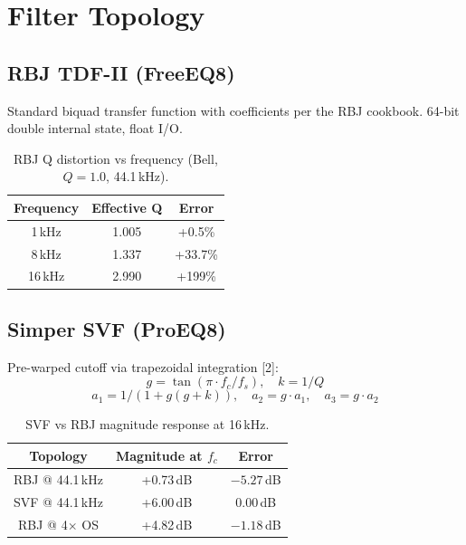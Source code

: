 \documentclass[twoside,a4paper]{article}
\begin{document}
\section{Filter Topology}
\subsection{RBJ TDF-II (FreeEQ8)}
Standard biquad transfer function with coefficients per the RBJ cookbook. 64-bit double internal state, float I/O.

\begin{table}[ht]
  \caption{RBJ Q distortion vs frequency (Bell, $Q=1.0$, 44.1\,kHz).}
  \centering
  \begin{tabular}{ccc}\toprule
    Frequency & Effective Q & Error \\\midrule
    1\,kHz & 1.005 & +0.5\% \\
    8\,kHz & 1.337 & +33.7\% \\
    16\,kHz & 2.990 & +199\% \\\bottomrule
  \end{tabular}
  \label{tab:qdistortion}
\end{table}

\subsection{Simper SVF (ProEQ8)}
Pre-warped cutoff via trapezoidal integration [2]:
\begin{equation}
g = \tan(\pi \cdot f_c / f_s), \quad k = 1/Q
\end{equation}
\begin{equation}
a_1 = 1 / (1 + g(g + k)), \quad a_2 = g \cdot a_1, \quad a_3 = g \cdot a_2
\end{equation}

\begin{table}[ht]
  \caption{SVF vs RBJ magnitude response at 16\,kHz.}
  \centering
  \begin{tabular}{ccc}\toprule
    Topology & Magnitude at $f_c$ & Error \\\midrule
    RBJ @ 44.1\,kHz & +0.73\,dB & $-5.27$\,dB \\
    SVF @ 44.1\,kHz & +6.00\,dB & 0.00\,dB \\
    RBJ @ 4$\times$ OS & +4.82\,dB & $-1.18$\,dB \\\bottomrule
  \end{tabular}
  \label{tab:svfvsrbj}
\end{table}
\end{document}
